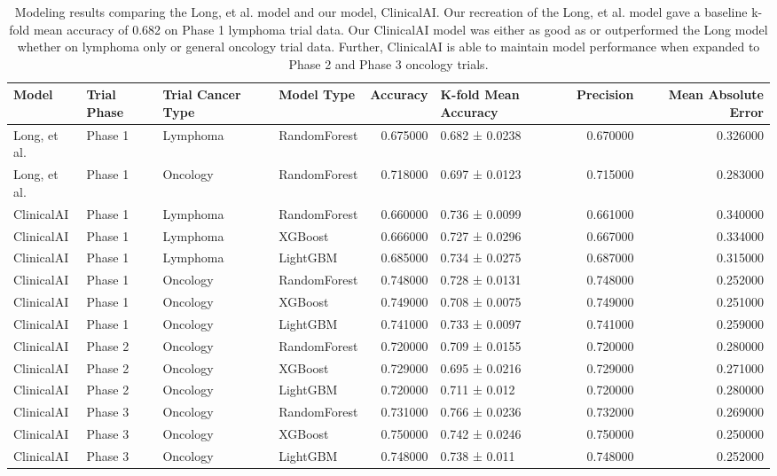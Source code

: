 \begin{table}
\caption{Modeling results comparing the Long, et al. model and our model, ClinicalAI. Our recreation of the Long, et al. model gave a baseline k-fold mean accuracy of 0.682 on Phase 1 lymphoma trial data. Our ClinicalAI model was either as good as or outperformed the Long model whether on lymphoma only or general oncology trial data. Further, ClinicalAI is able to maintain model performance when expanded to Phase 2 and Phase 3 oncology trials.}
\label{tab:model_performance}
\begin{tabular}{llllrlrr}
\toprule
Model & Trial Phase & Trial Cancer Type & Model Type & Accuracy & K-fold Mean Accuracy & Precision & Mean Absolute Error \\
\midrule
Long, et al. & Phase 1 & Lymphoma & RandomForest & 0.675000 & 0.682 ± 0.0238 & 0.670000 & 0.326000 \\
Long, et al. & Phase 1 & Oncology & RandomForest & 0.718000 & 0.697 ± 0.0123 & 0.715000 & 0.283000 \\
ClinicalAI & Phase 1 & Lymphoma & RandomForest & 0.660000 & 0.736 ± 0.0099 & 0.661000 & 0.340000 \\
ClinicalAI & Phase 1 & Lymphoma & XGBoost & 0.666000 & 0.727 ± 0.0296 & 0.667000 & 0.334000 \\
ClinicalAI & Phase 1 & Lymphoma & LightGBM & 0.685000 & 0.734 ± 0.0275 & 0.687000 & 0.315000 \\
ClinicalAI & Phase 1 & Oncology & RandomForest & 0.748000 & 0.728 ± 0.0131 & 0.748000 & 0.252000 \\
ClinicalAI & Phase 1 & Oncology & XGBoost & 0.749000 & 0.708 ± 0.0075 & 0.749000 & 0.251000 \\
ClinicalAI & Phase 1 & Oncology & LightGBM & 0.741000 & 0.733 ± 0.0097 & 0.741000 & 0.259000 \\
ClinicalAI & Phase 2 & Oncology & RandomForest & 0.720000 & 0.709 ± 0.0155 & 0.720000 & 0.280000 \\
ClinicalAI & Phase 2 & Oncology & XGBoost & 0.729000 & 0.695 ± 0.0216 & 0.729000 & 0.271000 \\
ClinicalAI & Phase 2 & Oncology & LightGBM & 0.720000 & 0.711 ± 0.012 & 0.720000 & 0.280000 \\
ClinicalAI & Phase 3 & Oncology & RandomForest & 0.731000 & 0.766 ± 0.0236 & 0.732000 & 0.269000 \\
ClinicalAI & Phase 3 & Oncology & XGBoost & 0.750000 & 0.742 ± 0.0246 & 0.750000 & 0.250000 \\
ClinicalAI & Phase 3 & Oncology & LightGBM & 0.748000 & 0.738 ± 0.011 & 0.748000 & 0.252000 \\
\bottomrule
\end{tabular}
\end{table}
